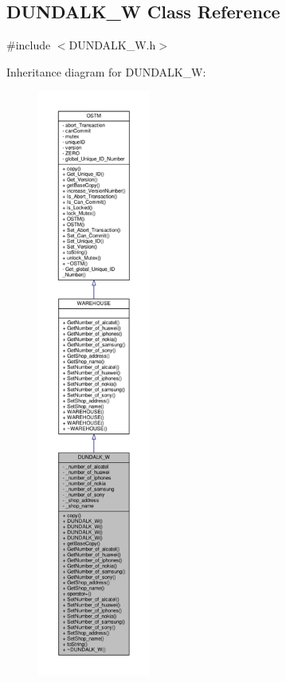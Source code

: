 \hypertarget{class_d_u_n_d_a_l_k___w}{}\subsection{D\+U\+N\+D\+A\+L\+K\+\_\+W Class Reference}
\label{class_d_u_n_d_a_l_k___w}


{\ttfamily \#include $<$D\+U\+N\+D\+A\+L\+K\+\_\+\+W.\+h$>$}



Inheritance diagram for D\+U\+N\+D\+A\+L\+K\+\_\+W\+:\nopagebreak
\begin{figure}[H]
\begin{center}
\leavevmode
\includegraphics[height=550pt]{class_d_u_n_d_a_l_k___w__inherit__graph}
\end{center}
\end{figure}


